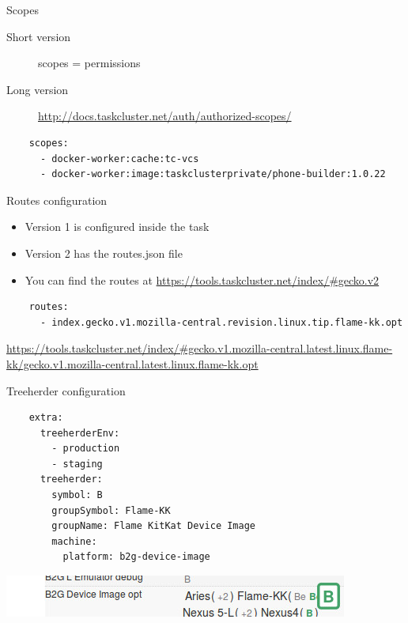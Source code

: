 \documentclass[pdf]{beamer}
\begin{document}
\begin{frame}[fragile]{Scopes}
  \begin{description}
    \item[Short version] scopes = permissions
    \item[Long version] \url{http://docs.taskcluster.net/auth/authorized-scopes/}
  \end{description}
  \tiny
  \begin{lstlisting}
    scopes:
      - docker-worker:cache:tc-vcs
      - docker-worker:image:taskclusterprivate/phone-builder:1.0.22
  \end{lstlisting}
\end{frame}

\begin{frame}[fragile]{Routes configuration}
  \begin{itemize}
    \item Version 1 is configured inside the task
    \item Version 2 has the routes.json file
    \item You can find the routes at \url{https://tools.taskcluster.net/index/\#gecko.v2}
  \end{itemize}
  \tiny
  \begin{lstlisting}
    routes:
      - index.gecko.v1.mozilla-central.revision.linux.tip.flame-kk.opt
  \end{lstlisting}
  \url{https://tools.taskcluster.net/index/\#gecko.v1.mozilla-central.latest.linux.flame-kk/gecko.v1.mozilla-central.latest.linux.flame-kk.opt}
\end{frame}

\begin{frame}[fragile]{Treeherder configuration}
  \begin{lstlisting}
    extra:
      treeherderEnv:
        - production
        - staging
      treeherder:
        symbol: B
        groupSymbol: Flame-KK
        groupName: Flame KitKat Device Image
        machine:
          platform: b2g-device-image
  \end{lstlisting}
  \begin{center}
    \includegraphics[scale=0.50]{img/treeheder.jpg}
  \end{center}
\end{frame}
\end{document}
